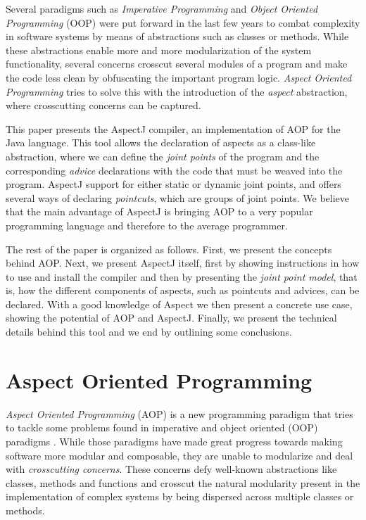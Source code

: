 \documentclass{template}
\begin{document}
Several paradigms such as \emph{Imperative Programming} and \emph{Object Oriented Programming} (OOP) were put forward in the last few years
to combat complexity in software systems by means of abstractions such as classes or methods. While these abstractions enable
more and more modularization of the system functionality, several concerns crosscut several modules of a program and make
the code less clean by obfuscating the important program logic. \emph{Aspect Oriented Programming} tries to solve this
with the introduction of the \emph{aspect} abstraction, where crosscutting concerns can be captured.

This paper presents the AspectJ compiler, an implementation of AOP for the Java language. This tool allows the declaration
of aspects as a class-like abstraction, where we can define the \emph{joint points} of the program and the corresponding
\emph{advice} declarations with the code that must be weaved into the program. AspectJ support for either static or dynamic joint points,
and offers several ways of declaring \emph{pointcuts}, which are groups of joint points.
We believe that the main advantage of AspectJ is bringing AOP to a very popular programming language and therefore to the average programmer.

The rest of the paper is organized as follows. First, we present the concepts behind AOP. Next, we present
AspectJ itself, first by showing instructions in how to use and install the compiler and then by presenting the \emph{joint point model},
that is, how the different components of aspects, such as pointcuts and advices, can be declared. With a good knowledge
of Aspect we then present a concrete use case, showing the potential of AOP and AspectJ. Finally, we present the technical details
behind this tool and we end by outlining some conclusions.

\section{Aspect Oriented Programming}

\emph{Aspect Oriented Programming} (AOP) is a new programming paradigm that tries to tackle some problems
found in imperative and object oriented (OOP) paradigms \cite{Kiczales97aspect-orientedprogramming}. While those paradigms have made great progress towards
making software more modular and composable, they are unable to modularize and deal with \emph{crosscutting concerns}.
These concerns defy well-known abstractions like classes, methods and functions and crosscut the
natural modularity present in the implementation of complex systems by being dispersed
across multiple classes or methods. \cite{Kiczales01anoverview}
\end{document}
